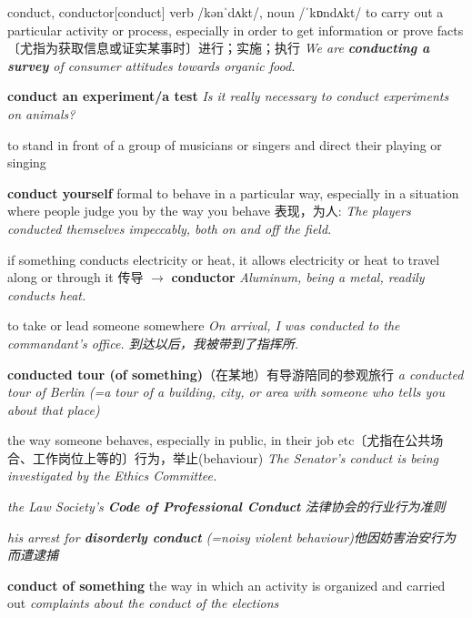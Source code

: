 \begin{DefWord}{conduct, conductor}[conduct]
    verb /kənˈdʌkt/, noun  /ˈkɒndʌkt/ 
    to carry out a particular activity or process, especially in order to get information or prove facts 〔尤指为获取信息或证实某事时〕进行；实施；执行
    \textit{We are \textbf{conducting a survey} of consumer attitudes towards organic food.}

    \textbf{conduct an experiment/a test}
    \textit{Is it really necessary to conduct experiments on animals?}

    to stand in front of a group of musicians or singers and direct their playing or singing

    \textbf{conduct yourself} formal to behave in a particular way, especially in a situation where people judge you by the way you behave 表现，为人:
    \textit{The players conducted themselves impeccably, both on and off the field.}


    if something conducts electricity or heat, it allows electricity or heat to travel along or through it 传导 $\rightarrow$ \textbf{conductor}
    \textit{Aluminum, being a metal, readily conducts heat.}

    to take or lead someone somewhere
    \textit{On arrival, I was conducted to the commandant's office. 到达以后，我被带到了指挥所. }

    \textbf{conducted tour (of something)}（在某地）有导游陪同的参观旅行
    \textit{a conducted tour of Berlin (=a tour of a building, city, or area with someone who tells you about that place)}

    the way someone behaves, especially in public, in their job etc〔尤指在公共场合、工作岗位上等的〕行为，举止(behaviour)
    \textit{The Senator's conduct is being investigated by the Ethics Committee.}

    \textit{the Law Society's \textbf{Code of Professional Conduct} 法律协会的行业行为准则}

    \textit{his arrest for \textbf{disorderly conduct} (=noisy violent behaviour)他因妨害治安行为而遭逮捕}

    \textbf{conduct of something} the way in which an activity is organized and carried out
   \textit{complaints about the conduct of the elections}
\end{DefWord}